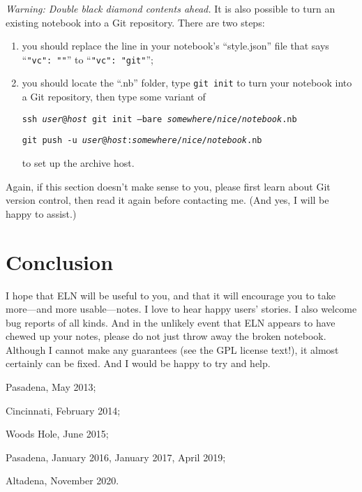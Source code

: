 \documentclass[11pt]{report}
\def\terminal#1{{\tt#1}}
\begin{document}
\emph{Warning: Double black diamond contents ahead.} It is also
possible to turn an existing notebook into a Git repository. There are
two steps:
\begin{enumerate}
  \item you should replace the line in your notebook's
    ``style.json'' file that says ``{\tt"vc":~""}'' to ``{\tt"vc":~"git"}'';
    \item you
should locate the ``.nb'' folder, type \terminal{git init} to turn your
notebook into a Git repository, then type some variant of

\terminal{ssh
\emph{user}@\emph{host} git init --bare
\emph{somewhere}/\emph{nice}/\emph{notebook}.nb}\vspace{-5pt}

\terminal{git push -u
\emph{user}@\emph{host}:\emph{somewhere}/\emph{nice}/\emph{notebook}.nb}

to set up the archive host.
\end{enumerate}
Again, if this section doesn't make sense to you, please first learn
about Git version control, then read it again before
contacting me. (And yes, I will be happy to assist.)

\section{Conclusion}

I hope that ELN will be useful to you, and that it will encourage you
to take more---and more usable---notes. I love to hear happy users'
stories. I also welcome bug reports of all kinds. And in the unlikely
event that ELN appears to have chewed up your notes, please do not
just throw away the broken notebook. Although I cannot make any
guarantees (see the GPL license text!), it almost certainly can be
fixed. And I would be happy to try and help.

\bigskip

\noindent Pasadena, May 2013;

\noindent Cincinnati, February 2014;

\noindent Woods Hole, June 2015;

\noindent Pasadena, January 2016, January 2017, April 2019;

\noindent Altadena, November 2020.
\end{document}

